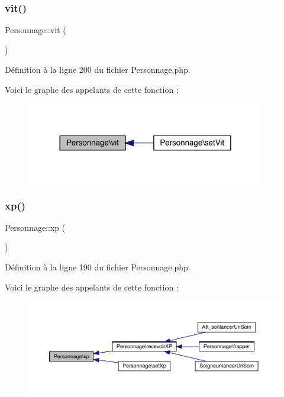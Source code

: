 \subsubsection{\texorpdfstring{vit()}{vit()}}
{\footnotesize\ttfamily Personnage\+::vit (\begin{DoxyParamCaption}{ }\end{DoxyParamCaption})}



Définition à la ligne 200 du fichier Personnage.\+php.

Voici le graphe des appelants de cette fonction \+:\nopagebreak
\begin{figure}[H]
\begin{center}
\leavevmode
\includegraphics[width=296pt]{class_personnage_a2b3231199bcc4e3515dfada8efb24313_icgraph}
\end{center}
\end{figure}
\mbox{\label{class_personnage_a60b2a6a44bc71517c063d87c062e0b87}} 
\subsubsection{\texorpdfstring{xp()}{xp()}}
{\footnotesize\ttfamily Personnage\+::xp (\begin{DoxyParamCaption}{ }\end{DoxyParamCaption})}



Définition à la ligne 190 du fichier Personnage.\+php.

Voici le graphe des appelants de cette fonction \+:\nopagebreak
\begin{figure}[H]
\begin{center}
\leavevmode
\includegraphics[width=350pt]{class_personnage_a60b2a6a44bc71517c063d87c062e0b87_icgraph}
\end{center}
\end{figure}
\mbox{\label{class_personnage_aa5bc9f2bda281400fedbc1af1c19357d}} 
